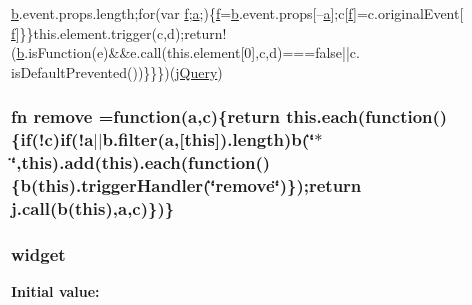 \begin{DoxyCode}
\hyperlink{jquery-ui-tabs_8js_ac0431efac4d7c393d1e70b86115cb93f}{b}.event.props.length;\textcolor{keywordflow}{for}(var \hyperlink{_col_reorder_8min_8js_ad5a69a22a09c1158b06b6f2c53bf04f1}{f};\hyperlink{chosen_8jquery_8min_8js_a4124bc0a9335c27f086f24ba207a4912}{a};)\{\hyperlink{_col_reorder_8min_8js_ad5a69a22a09c1158b06b6f2c53bf04f1}{f}=\hyperlink{jquery-ui-tabs_8js_ac0431efac4d7c393d1e70b86115cb93f}{b}.event.props[--\hyperlink{chosen_8jquery_8min_8js_a4124bc0a9335c27f086f24ba207a4912}{a}];c[\hyperlink{_col_reorder_8min_8js_ad5a69a22a09c1158b06b6f2c53bf04f1}{f}]=c.originalEvent[
      \hyperlink{_col_reorder_8min_8js_ad5a69a22a09c1158b06b6f2c53bf04f1}{f}]\}\}this.element.trigger(c,d);\textcolor{keywordflow}{return}!(\hyperlink{jquery-ui-tabs_8js_ac0431efac4d7c393d1e70b86115cb93f}{b}.isFunction(e)&&e.call(this.element[0],c,d)===\textcolor{keyword}{false}||c.
      isDefaultPrevented())\}\}\})(\hyperlink{jquery-ui-tabs_8js_a2b1d6f9c448e3ce72f4e1865d6e38d2c}{jQuery})
\end{DoxyCode}
\hypertarget{jquery-ui-tabs_8js_adaff9bdbc51aff0ee86be9b34e0c353c}{
\subsubsection[{remove}]{ {\bf fn} remove =function({\bf a},{\bf c})\{return {\bf this.\+each}(function()\{{\bf if}(!{\bf c}){\bf if}(!{\bf a}$\vert$$\vert$b.\+filter({\bf a},\mbox{[}{\bf this}\mbox{]}).length){\bf b}(\char`\"{}$\ast$\char`\"{},{\bf this}).{\bf add}({\bf this}).{\bf each}(function()\{{\bf b}({\bf this}).trigger\+Handler(\char`\"{}remove\char`\"{})\});return j.\+call({\bf b}({\bf this}),{\bf a},{\bf c})\})\}}}\label{jquery-ui-tabs_8js_adaff9bdbc51aff0ee86be9b34e0c353c}
\hypertarget{jquery-ui-tabs_8js_a60d5947424f4fcd4ca9ed05e6dc43227}{
\subsubsection[{widget}]{\setlength{\rightskip}{0pt plus 5cm}widget}}\label{jquery-ui-tabs_8js_a60d5947424f4fcd4ca9ed05e6dc43227}
{\bfseries Initial value\+:}
